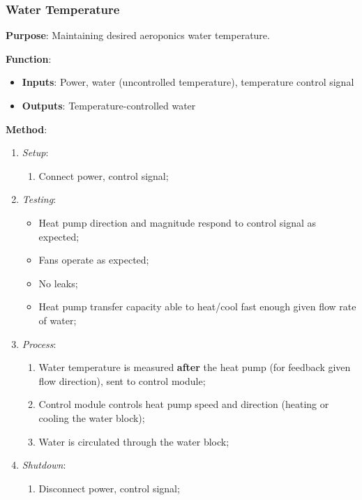 \documentclass{report}
\begin{document}
\newpage

\subsubsection{Water Temperature}
\label{sec:watertemp}

\textbf{Purpose}: Maintaining desired aeroponics water temperature.

\textbf{Function}: 
\begin{itemize}
    \item \textbf{Inputs}: Power, water (uncontrolled temperature), temperature control signal
    \item \textbf{Outputs}: Temperature-controlled water
\end{itemize}

\textbf{Method}:
\begin{enumerate}
    \item \textit{Setup}:
    \begin{enumerate}
        \item Connect power, control signal;
    \end{enumerate}
    \item \textit{Testing}:
    \begin{itemize}
        \item Heat pump direction and magnitude respond to control signal as expected;
        \item Fans operate as expected;
        \item No leaks;
        \item Heat pump transfer capacity able to heat/cool fast enough given flow rate of water;
    \end{itemize}
    \item \textit{Process}:
    \begin{enumerate}
        \item Water temperature is measured \textbf{after} the heat pump (for feedback given flow direction), sent to control module;
        \item Control module controls heat pump speed and direction (heating or cooling the water block);
        \item Water is circulated through the water block;
    \end{enumerate}
    \item \textit{Shutdown}:
    \begin{enumerate}
        \item Disconnect power, control signal;
    \end{enumerate}
\end{enumerate}
\end{document}
